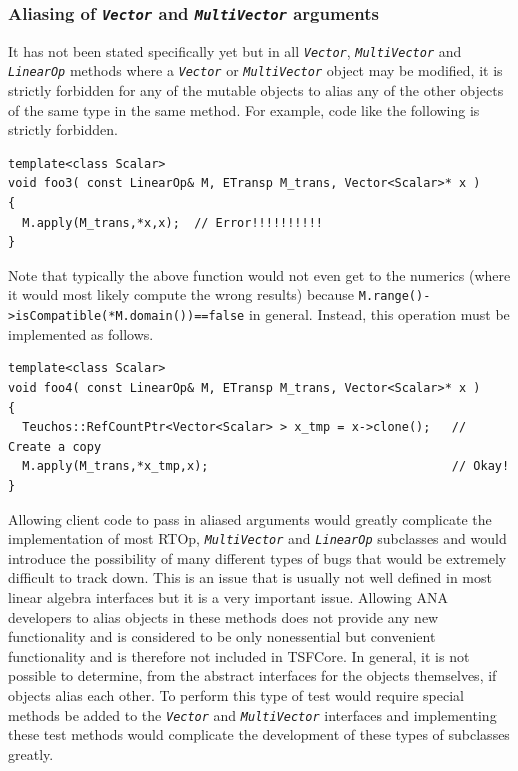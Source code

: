 %
\subsubsection{Aliasing of {}\texttt{\textit{Vector}} and {}\texttt{\textit{Multi\-Vector}} arguments}
\label{tsfcore:sec:aliasing}
%

It has not been stated specifically yet but in all
{}\texttt{\textit{Vector}}, {}\texttt{\textit{Multi\-Vector}} and
{}\texttt{\textit{LinearOp}} methods where a
{}\texttt{\textit{Vector}} or {}\texttt{\textit{Multi\-Vector}} object
may be modified, it is strictly forbidden for any of the mutable
objects to alias any of the other objects of the same type in the same
method.  For example, code like the following is strictly forbidden.

{\scriptsize\begin{verbatim}
template<class Scalar>
void foo3( const LinearOp& M, ETransp M_trans, Vector<Scalar>* x )
{
  M.apply(M_trans,*x,x);  // Error!!!!!!!!!!
}
\end{verbatim}}

{}\noindent{}Note that typically the above function would not even get
to the numerics (where it would most likely compute the wrong results)
because {}\texttt{M.range()->isCompatible(*M.domain())==false} in
general.  Instead, this operation must be implemented as follows.

{\scriptsize\begin{verbatim}
template<class Scalar>
void foo4( const LinearOp& M, ETransp M_trans, Vector<Scalar>* x )
{
  Teuchos::RefCountPtr<Vector<Scalar> > x_tmp = x->clone();   // Create a copy
  M.apply(M_trans,*x_tmp,x);                                  // Okay!
}
\end{verbatim}}

{}\noindent{}Allowing client code to pass in aliased arguments would
greatly complicate the implementation of most RTOp,
{}\texttt{\textit{Multi\-Vector}} and {}\texttt{\textit{LinearOp}}
subclasses and would introduce the possibility of many different types
of bugs that would be extremely difficult to track down.  This is an
issue that is usually not well defined in most linear algebra
interfaces but it is a very important issue.  Allowing ANA developers
to alias objects in these methods does not provide any new
functionality and is considered to be only nonessential but convenient
functionality and is therefore not included in TSFCore.  In general,
it is not possible to determine, from the abstract interfaces for the
objects themselves, if objects alias each other.  To perform this type
of test would require special methods be added to the
{}\texttt{\textit{Vector}} and {}\texttt{\textit{Multi\-Vector}}
interfaces and implementing these test methods would complicate the
development of these types of subclasses greatly.

